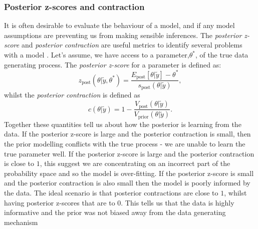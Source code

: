 \documentclass[12pt,english]{article}
\begin{document}
\subsubsection{Posterior z-scores and contraction}
It is often desirable to evaluate the behaviour of a model, and if any model assumptions are preventing us from making sensible inferences. The \textit{posterior z-score} and \textit{posterior contraction} are useful metrics to identify several problems with a model \citep{Betancourt::2021}. Let's assume, we have access to a parameter,$\theta^*$, of the true data generating process. The \textit{posterior z-score} for a parameter is defined as:
\begin{equation}
z_{\text{post}}(\theta|\tilde{y}, \theta^*) = \frac{E_{\text{post}}[\theta|\tilde{y}] - \theta^*}{s_{\text{post}}(\theta|\tilde{y})},
\end{equation}
whilst the \textit{posterior contraction} is defined as
\begin{equation}
c(\theta|\tilde{y}) = 1 - \frac{V_\text{post}(\theta|\tilde{y})}{V_\text{prior}(\theta|\tilde{y})}.
\end{equation}
Together these quantities tell us about how the posterior is learning from the data. If the posterior z-score is large and the posterior contraction is small, then the prior modelling conflicts with the true process - we are unable to learn the true parameter well. If the posterior z-score is large and the posterior contraction is close to $1$, this suggest we are concentrating on an incorrect part of the probability space and so the model is over-fitting. If the posterior z-score is small and the posterior contraction is also small then the model is poorly informed by the data. The ideal scenario is that posterior contractions are close to $1$, whilst having posterior z-scores that are to $0$. This tells us that the data is highly informative and the prior was not biased away from the data generating mechanism
\end{document}
